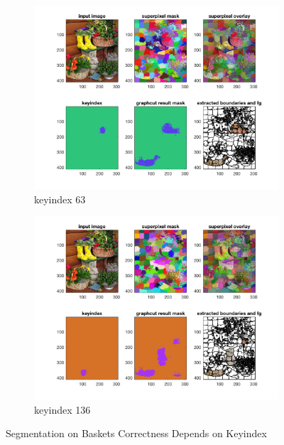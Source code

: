 \begin{figure}[htbp]
	\centering
    \begin{subfigure}[t]{0.84\textwidth}
        \centering
        \includegraphics[width=\textwidth]{hw5/basket1.png}
		\caption{keyindex 63}\label{fig:24a}
    \end{subfigure}
    \begin{subfigure}[t]{0.84\textwidth}
        \centering
        \includegraphics[width=\textwidth]{hw5/basket2.png}
		\caption{keyindex 136}\label{fig:24b}
    \end{subfigure}
    \caption{Segmentation on Baskets Correctness  Depends on Keyindex}
    \label{fig:24}
\end{figure}
